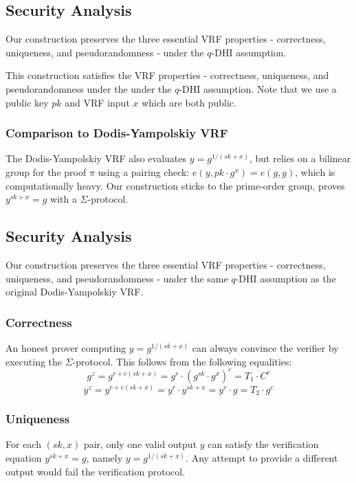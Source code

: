 \subsection{Security Analysis}
Our construction preserves the three essential VRF properties - correctness, uniqueness, and pseudorandomness - under the $q$-DHI assumption.


This construction satisfies the VRF properties - correctness, uniqueness, and pseudorandomness under the under the $q$-DHI assumption. Note that we use a public key $pk$ and VRF input $x$ which are both public. 

\subsubsection{Comparison to Dodis-Yampolskiy VRF}
The Dodis-Yampolskiy VRF also evaluates $y = g^{1/(sk + x)}$, but relies on a bilinear group for the proof $\pi$ using a pairing check: $e(y, pk \cdot g^x) = e(g, g)$, which is computationally heavy. Our construction sticks to the prime-order group, proves $y^{sk + x} = g$ with a $\Sigma$-protocol.


\subsection{Security Analysis}
Our construction preserves the three essential VRF properties - correctness, uniqueness, and pseudorandomness - under the same $q$-DHI assumption as the original Dodis-Yampolskiy VRF.

\subsubsection*{Correctness}
An honest prover computing $y = g^{1/(sk+x)}$ can always convince the verifier by executing the $\Sigma$-protocol. This follows from the following equalities:
$$g^z = g^{r + c(sk+x)} = g^r \cdot (g^{sk} \cdot g^x)^c = T_1 \cdot C^c$$
$$y^z = y^{r + c(sk+x)} = y^r \cdot y^{sk+x} = y^r \cdot g = T_2 \cdot g^c$$

\subsubsection*{Uniqueness}
For each $(sk,x)$ pair, only one valid output $y$ can satisfy the verification equation $y^{sk+x} = g$, namely $y = g^{1/(sk+x)}$. Any attempt to provide a different output would fail the verification protocol.

